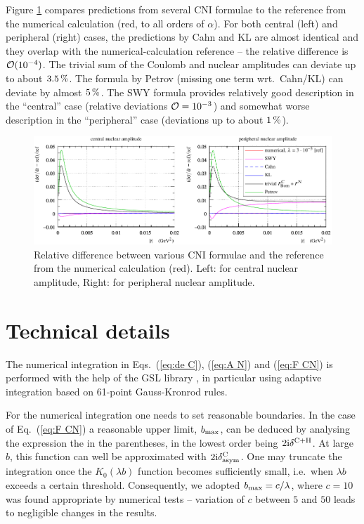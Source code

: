\documentclass[pdftex,twocolumn,epjc3]{svjour3}
\def\un#1{\,{\rm #1}}
\def\I{{\rm i}}
\begin{document}
Figure \ref{f:sig form} compares predictions from several CNI formulae to the reference from the numerical calculation (red, to all orders of $\alpha$). For both central (left) and peripheral (right) cases, the predictions by Cahn and KL are almost identical and they overlap with the numerical-calculation reference -- the relative difference is ${\cal O}(10^{-4})$. The trivial sum of the Coulomb and nuclear amplitudes can deviate up to about $3.5\un{\%}$. The formula by Petrov (missing one term wrt.~Cahn/KL) can deviate by almost $5\un{\%}$. The SWY formula provides relatively good description in the ``central'' case (relative deviations ${\cal O} = 10^{-3}$) and somewhat worse description in the ``peripheral'' case (deviations up to about $1\un{\%}$).

\begin{figure}[h]
\begin{center}
\includegraphics{fig/cni_dsdt_cmp_formula.pdf}
\caption{Relative difference between various CNI formulae and the reference from the numerical calculation (red). Left: for central nuclear amplitude, Right: for peripheral nuclear amplitude.}
\label{f:sig form}
\end{center}
\end{figure}



\section{Technical details}
\label{sec:technical}

The numerical integration in Eqs.~(\ref{eq:de C}), (\ref{eq:A N}) and (\ref{eq:F CN}) is performed with the help of the GSL library \cite{gsl}, in particular using adaptive integration based on 61-point Gauss-Kronrod rules.

For the numerical integration one needs to set reasonable boundaries. In the case of Eq.~(\ref{eq:F CN}) a reasonable upper limit, $b_{\rm max}$, can be deduced by analysing the expression the in the parentheses, in the lowest order being $2\I\delta^{\rm C+H}$. At large $b$, this function can well be approximated with $2\I\delta^{\rm C}_{\rm asym}$. One may truncate the integration once the $K_0(\lambda b)$ function becomes sufficiently small, i.e.~when $\lambda b$ exceeds a certain threshold. Consequently, we adopted $b_{\rm max} = c / \lambda$, where $c = 10$ was found appropriate by numerical tests -- variation of $c$ between $5$ and $50$ leads to negligible changes in the results.
\end{document}
